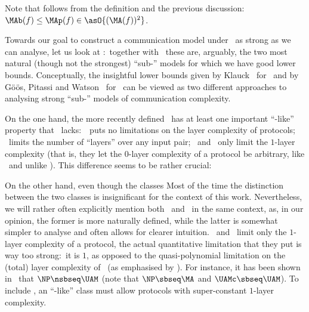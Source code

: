 Note that
\mal{
\MA\sbseq\MAb
}
follows from the definition and the previous discussion: $\MAb(f)\le\MAp(f)\in\asO{(\MA(f))^2}$.

Towards our goal to construct a communication model under \AM\ as strong as we can analyse, let us look at \UAMc:\ together with \MA\ these are, arguably, the two most natural (though not the strongest) ``sub-\AM'' models for which we have good lower bounds.
Conceptually, the insightful lower bounds given by Klauck~\cite{K03_Rec} for \MA\ and by G\"o\"os, Pitassi and Watson~\cite{GPW15_Zero} for \UAMc\ can be viewed as two different approaches to analysing strong ``sub-\AM'' models of communication complexity.

On the one hand, the more recently defined \UAMc\ has at least one important ``\AM-like'' property that \MA\ lacks:\ \AM\ puts no limitations on the layer complexity of protocols; \MA\ limits the number of ``layers'' over any input pair; \UAMc\ and \UAM\ only limit the $1$-layer complexity (that is, they let the $0$-layer complexity of a protocol be arbitrary, like \AM\ and unlike \MA).
This difference seems to be rather crucial:

On the other hand, even though the classes\fn
{
Most of the time the distinction between the two classes is insignificant for the context of this work.
Nevertheless, we will rather often explicitly mention both \UAM\ and \UAMc\ in the same context, as, in our opinion, the former is more naturally defined, while the latter is somewhat simpler to analyse and often allows for clearer intuition.
}
\UAMc\ and \UAM\ limit only the $1$-layer complexity of a protocol, the actual quantitative limitation that they put is way too strong:\ it is $1$, as opposed to the quasi-polynomial limitation on the (total) layer complexity of \MA\ (as emphasised by ).
For instance, it has been shown in~\cite{GPW15_Zero} that $\NP\nsbseq\UAM$ (note that $\NP\sbseq\MA$ and $\UAMc\sbseq\UAM$).
To include \NP, an ``\NP-like'' class must allow protocols with super-constant $1$-layer complexity.

